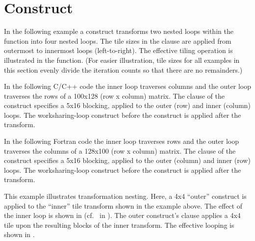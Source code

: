 \section{ Construct}
\label{sec:tile}

In the following example a  construct transforms two nested loops
within the  function into four nested loops.
The tile sizes in the  clause are applied from outermost
to innermost loops (left-to-right). The effective tiling operation is illustrated in
the  function. 
(For easier illustration, tile sizes for all examples in this section evenly 
divide the iteration counts so that there are no remainders.)

In the following C/C++ code the inner loop traverses columns
and the outer loop traverses the rows of a 100x128 (row x column) matrix.  
The  clause of the  construct specifies
a 5x16 blocking, applied to the outer (row) and inner (column) loops.
The worksharing-loop construct before the 
construct is applied after the transform.


In the following Fortran code the inner loop traverses rows 
and the outer loop traverses the columns of a 128x100 (row x column) matrix.  
The   clause of the  construct specifies 
a 5x16 blocking, applied to the outer (column) and inner (row) loops.
The worksharing-loop construct before the 
construct is applied after the transform.

\clearpage

This example illustrates transformation nesting.
Here, a 4x4 ``outer''   construct is applied to the ``inner'' tile transform shown in the example above.
The effect of the inner loop is shown in  (cf.\  in ).
The outer  construct's  clause applies a 4x4 tile upon the resulting
blocks of the inner transform.  The effective looping is shown in .

